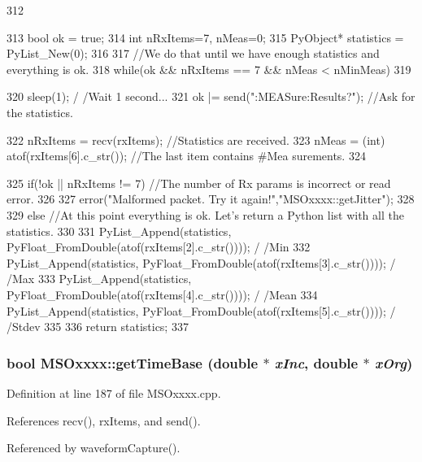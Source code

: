 \begin{DoxyCode}
312 {   
313     bool            ok = true;
314     int             nRxItems=7, nMeas=0;
315     PyObject* statistics = PyList_New(0);
316 
317     //We do that until we have enough statistics and everything is ok.
318     while(ok && nRxItems == 7 && nMeas < nMinMeas)
319     {
320         sleep(1);                                                                   /
      /Wait 1 second...
321         ok |= send(":MEASure:Results?\n");              //Ask for the statistics.
      
322         nRxItems = recv(rxItems);                                   //Statistics 
      are received.
323         nMeas = (int) atof(rxItems[6].c_str());     //The last item contains #Mea
      surements.
324     }
325     if(!ok || nRxItems != 7)                                        //The number 
      of Rx params is incorrect or read error.
326     {
327         error("Malformed packet. Try it again!","MSOxxxx::getJitter");
328     }
329     else            //At this point everything is ok. Let's return a Python list 
      with all the statistics.
330     {
331         PyList_Append(statistics, PyFloat_FromDouble(atof(rxItems[2].c_str())));        /
      /Min
332         PyList_Append(statistics, PyFloat_FromDouble(atof(rxItems[3].c_str())));        /
      /Max
333         PyList_Append(statistics, PyFloat_FromDouble(atof(rxItems[4].c_str())));        /
      /Mean
334         PyList_Append(statistics, PyFloat_FromDouble(atof(rxItems[5].c_str())));        /
      /Stdev
335     }
336     return statistics;
337 }
\end{DoxyCode}
\hypertarget{classMSOxxxx_a9723e9234403d5eb74bde628fd78d56c}{
\subsubsection[{getTimeBase}]{\setlength{\rightskip}{0pt plus 5cm}bool MSOxxxx::getTimeBase (double $\ast$ {\em xInc}, \/  double $\ast$ {\em xOrg})}}
\label{classMSOxxxx_a9723e9234403d5eb74bde628fd78d56c}


Definition at line 187 of file MSOxxxx.cpp.

References recv(), rxItems, and send().

Referenced by waveformCapture().


